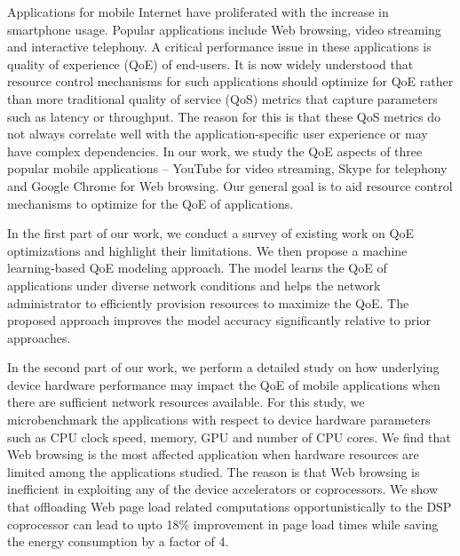 
Applications for mobile Internet have proliferated with the increase in smartphone usage. Popular applications include Web browsing, video streaming and interactive telephony. A critical performance issue in these applications is quality of experience (QoE) of end-users. It is now widely understood that resource control mechanisms for such applications should optimize for QoE rather than more traditional quality of service (QoS) metrics that capture parameters such as latency or throughput.  The reason for this is that these QoS metrics do not always correlate well with the application-specific user experience or may have complex dependencies. In our work, we study the QoE aspects of three popular mobile applications -- YouTube for video streaming, Skype for telephony and Google Chrome for Web browsing. Our general goal is to aid resource control mechanisms to optimize for the QoE of applications. 
     
In the first part of our work, we conduct a survey of existing work on QoE optimizations and highlight their limitations. We then propose a machine learning-based QoE modeling approach. 
The model learns the QoE of applications under diverse network conditions and helps the network administrator to efficiently provision resources to maximize the QoE. The proposed approach improves the model accuracy significantly relative to prior approaches. 
      
In the second part of our work, we perform a detailed study on how underlying device hardware performance may impact the QoE of mobile applications when there are sufficient network resources available. For this study, we microbenchmark the applications with respect to device hardware parameters such as CPU clock speed, memory, GPU and number of CPU cores. We find that Web browsing is the most affected application when hardware resources are limited among the applications studied. The reason is that Web browsing is inefficient in exploiting any of the device accelerators or coprocessors. We show that offloading Web page load related computations opportunistically to the DSP coprocessor can lead to upto 18\% improvement in page load times while saving the energy consumption by a factor of 4.

